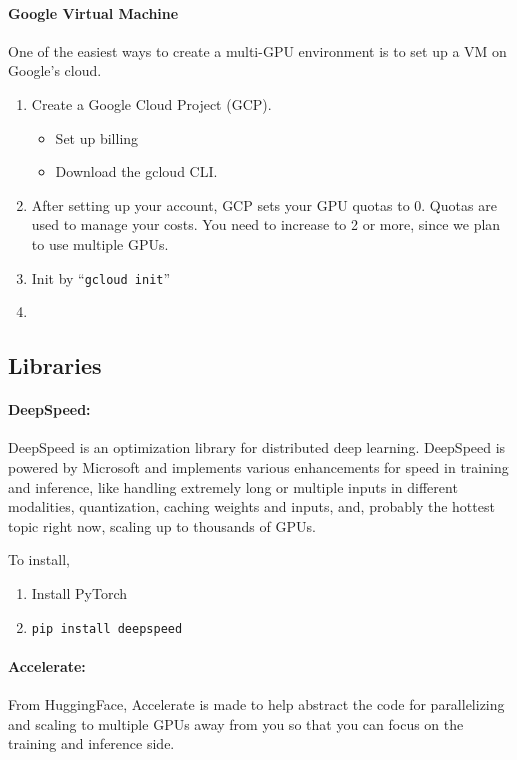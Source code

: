 \paragraph{Google Virtual Machine} One of the easiest ways to create a multi-GPU environment is to set up a VM on Google's cloud. 
\begin{enumerate}
	\item Create a Google Cloud Project (GCP).
		\begin{itemize}
			\item Set up billing
			\item Download the gcloud CLI. 
		\end{itemize}
	\item After setting up your account, GCP sets your GPU quotas to 0. Quotas are used to manage your costs. You need to increase to 2 or more, since we plan to use multiple GPUs.  
	\item Init by ``\texttt{gcloud init}''
	\item 
\end{enumerate}

\subsection{Libraries}

\paragraph{DeepSpeed:} DeepSpeed is an optimization library for distributed deep learning. DeepSpeed is powered by Microsoft and implements various enhancements for speed in training and inference, like handling extremely long or multiple inputs in different modalities, quantization, caching weights and inputs, and, probably the hottest topic right now, scaling up to thousands of GPUs.  

To install,
\begin{enumerate}
	\item Install PyTorch
	\item \texttt{pip install deepspeed}
\end{enumerate}

\paragraph{Accelerate:} From HuggingFace, Accelerate is made to help abstract the code for parallelizing and scaling to multiple GPUs away from you so that you can focus on the training and inference side. 

